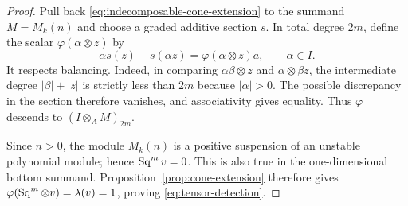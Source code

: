 \begin{proof}
Pull back \eqref{eq:indecomposable-cone-extension} to the summand
\(M=M_k(n)\) and choose a graded additive section \(s\). In total
degree \(2m\), define the scalar \(\varphi(\alpha\otimes z)\) by
\[
\alpha s(z)-s(\alpha z)=\varphi(\alpha\otimes z)a,
\qquad \alpha\in I.
\]
It respects balancing. Indeed, in comparing
\(\alpha\beta\otimes z\) and \(\alpha\otimes\beta z\), the
intermediate degree \(|\beta|+|z|\) is strictly less than \(2m\)
because \(|\alpha|>0\). The possible discrepancy in the section
therefore vanishes, and associativity gives equality. Thus
\(\varphi\) descends to \((I\otimes_A M)_{2m}\).

Since \(n>0\), the module \(M_k(n)\) is a positive suspension of
an unstable polynomial module; hence \(\operatorname{Sq}^m v=0\). This is also
true in the one-dimensional bottom summand. Proposition~\ref{prop:cone-extension}
therefore gives \(\varphi(\operatorname{Sq}^m\otimes v)=\lambda(v)=1\), proving
\eqref{eq:tensor-detection}.
\end{proof}

